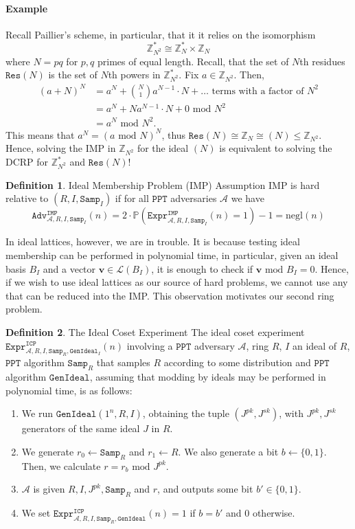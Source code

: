 \documentclass{article}
\theoremstyle{definition}
\newtheorem{definition}{Definition}[section]
\theoremstyle{example}
\newcommand{\A}{\mathcal{A}}
\renewcommand{\L}{\mathcal{L}}
\newcommand{\Prob}{\mathbb{P}}
\newcommand{\Int}{\mathbb{Z}}
\newcommand{\PPT}{\texttt{PPT}}
\newcommand{\negl}{\text{negl}}
\renewcommand{\mod}{\,\,\text{mod}\,\,}
\newcommand{\Expr}[2]{\texttt{Expr}^{\texttt{#1}}_{#2}}
\newcommand{\Adv}[2]{\texttt{Adv}^{\texttt{#1}}_{#2}}
\newcommand{\GenIdeal}{\texttt{GenIdeal}}
\newcommand{\Samp}{\texttt{Samp}}
\renewcommand{\vec}[1]{\mathbf{#1}}
\begin{document}
\paragraph{Example}
Recall Paillier's scheme, in particular, that it it relies on the isomorphism
\[
  \Int_{N^2}^* \cong \Int_N^* \times \Int_N
\]
where $N = pq$ for $p, q$ primes of equal length. Recall, that the set of $N$th
residues $\texttt{Res}(N)$ is the set of $N$th powers in $\Int_{N^2}^*$. Fix $a
\in \Int_{N^2}$. Then,
\begin{align*}
  (a + N)^N &= a^N + \binom{N}{1}a^{N-1}\cdot N + \hdots \text{ terms with a factor of } N^2 \\
            &= a^N + N a^{N-1}\cdot N + 0 \mod N^2 \\
            &= a^N \mod N^2.
\end{align*}
This means that $a^N = (a \mod N)^N$, thus $\texttt{Res}(N) \cong \Int_N \cong
(N) \leq \Int_{N^2}$. Hence, solving the IMP in $\Int_{N^2}$ for the ideal $(N)$
is equivalent to solving the DCRP for $\Int_{N^2}^*$ and $\texttt{Res}(N)$!
\begin{definition}{Ideal Membership Problem (IMP) Assumption}
  IMP is hard relative to $(R, I, \Samp_I)$ if for all $\PPT$ adversaries $\A$ we have
  \[
    \Adv{IMP}{\A, R, I, \Samp_I}(n) = 2 \cdot \Prob(\Expr{IMP}{\A, R, I, \Samp_I}(n) = 1) - 1 = \negl(n)
  \]
\end{definition}
In ideal lattices, however, we are in trouble. It is because testing ideal
membership can be performed in polynomial time, in particular, given an ideal basis
$B_I$ and a vector $\vec{v} \in \L(B_I)$, it is enough to check if $\vec{v}
\mod B_I = 0$. Hence, if we wish to use ideal lattices as our source of hard
problems, we cannot use any that can be reduced into the IMP. This observation
motivates our second ring problem.
\begin{definition}{The Ideal Coset Experiment} The ideal coset experiment
  $\Expr{ICP}{\A, R, I, \Samp_R, \GenIdeal_I}(n)$ involving a $\PPT$ adversary $\A$, ring
  $R$, $I$ an ideal of $R$, $\PPT$ algorithm $\Samp_R$ that samples $R$
  according to some distribution and $\PPT$ algorithm $\GenIdeal$, assuming that modding by ideals may be performed
  in polynomial time, is as follows:
  \begin{enumerate}
  \item We run $\GenIdeal(1^n, R, I)$, obtaining the tuple $(J^{pk}, J^{sk})$,
    with $J^{pk}, J^{sk}$ generators of the same ideal $J$ in $R$.
  \item We generate $r_0 \leftarrow \Samp_R$ and $r_1 \leftarrow R$.
    We also generate a bit $b \leftarrow \{0, 1\}$. Then, we calculate $r = r_b
    \mod J^{pk}$.
  \item $\A$ is given $R, I, J^{pk}, \Samp_R$ and $r$, and outputs some bit $b' \in \{0, 1\}$.
  \item We set $\Expr{ICP}{\A, R, I, \Samp_R, \GenIdeal}(n) = 1$ if $b = b'$ and $0$ otherwise.
  \end{enumerate}
\end{definition}
\end{document}

